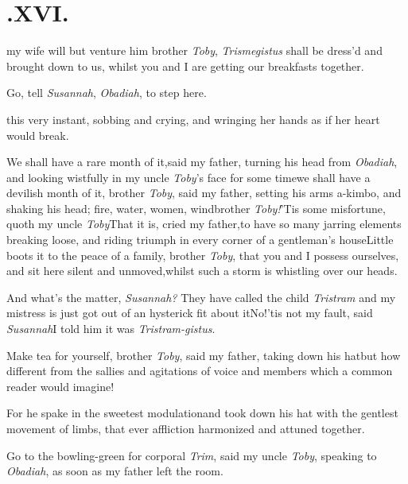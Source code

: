 \documentclass{article}
\begin{document}
\bigskip
\section{.\enspace XVI.}

 my wife will but venture him\tsk 
brother \textit{Toby}, \textit{Trismegistus} shall be\break
dress’d and brought down to us, whilst\break 
you and I are getting our breakfasts\break
together.\tsk

\tsk Go, tell \textit{Susannah}, \textit{Obadiah}, to step
here.

\break
this very instant, sobbing and crying,\break
and wringing her hands as if her heart\break
would break.\tsh{}

We shall have a rare month of it,\break said my father, turning his
head from \textit{Obadiah}, and looking wistfully in my uncle
\textit{Toby}’s face for some time\tsk we shall have a
devilish month of it, brother \textit{Toby}, said my father, setting
his arms a-kimbo, and shaking his head; fire, water, wo\-men,
wind\tsk brother \textit{Toby!}\tsk ’Tis some misfortune,
quoth my uncle \textit{Toby}\tsk That it is, cried my
father,\tsk to have so many jarring elements breaking loose, and
riding triumph in every corner of a gentleman’s house\tsk Little boots it to the peace
of a family, brother \textit{Toby}, that you and I possess ourselves,
and sit here silent and unmoved,\tsk whilst such a storm is
whistling over our heads.\tsh

\tsk And what’s the matter, \textit{Susannah?}\break
They have called the child \textit{Tristram}\tsh\break
and my mistress is just got out of an
hysterick fit about
it\tsk No!\tsk ’tis not my fault, said
\textit{Susannah}\tsk I told him it was \textit{Tristram-gistus}.

\tsh Make tea for yourself, brother \textit{Toby}, said
my father, taking down his hat\tsk but how different from
the sallies and agitations of voice and members which a common
reader would imagine!

\tsk For he spake in the sweetest modulation\tsk and took
down his hat with the\break
gentlest movement of limbs, that ever\break
affliction harmonized and attuned toge\-ther.

\tsk Go to the bowling-green for corpo\-ral \textit{Trim},
said my uncle \textit{Toby}, speaking to \textit{Obadiah}, as soon as
my father left the room.
\end{document}
